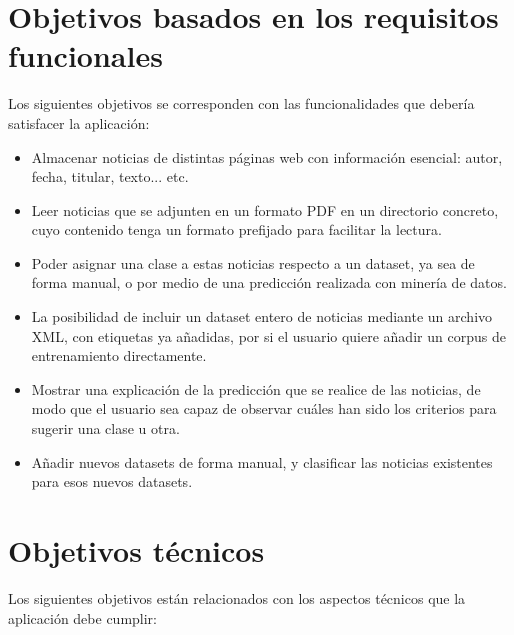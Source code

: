 
\section{Objetivos basados en los requisitos funcionales}

Los siguientes objetivos se corresponden con las funcionalidades que debería satisfacer la aplicación:

\begin{itemize}

\item Almacenar noticias de distintas páginas web con información esencial: autor, fecha, titular, texto... etc.

\item Leer noticias que se adjunten en un formato PDF en un directorio concreto, cuyo contenido tenga un formato prefijado para facilitar la lectura.

\item Poder asignar una clase a estas noticias respecto a un dataset, ya sea de forma manual, o por medio de una predicción realizada con minería de datos.

\item La posibilidad de incluir un dataset entero de noticias mediante un archivo XML, con etiquetas ya añadidas, por si el usuario quiere añadir un corpus de entrenamiento directamente.

\item Mostrar una explicación de la predicción que se realice de las noticias, de modo que el usuario sea capaz de observar cuáles han sido los criterios para sugerir una clase u otra.

\item Añadir nuevos datasets de forma manual, y clasificar las noticias existentes para esos nuevos datasets.

\end{itemize}


\section{Objetivos técnicos}

Los siguientes objetivos están relacionados con los aspectos técnicos que la aplicación debe cumplir: 

